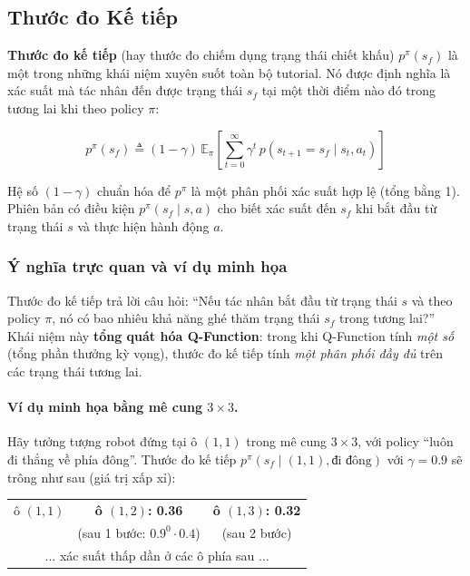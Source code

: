 \subsection{Thước đo Kế tiếp}
 
\textbf{Thước đo kế tiếp} (hay thước đo chiếm dụng trạng thái chiết khấu)
$p^\pi(s_f)$ là một trong những khái niệm xuyên suốt toàn bộ tutorial.
Nó được định nghĩa là xác suất mà tác nhân đến được trạng thái $s_f$ tại
một thời điểm nào đó trong tương lai khi theo policy $\pi$:
 
\begin{equation}
    p^\pi(s_f) \triangleq (1-\gamma) \, \mathbb{E}_\pi \left[
    \sum_{t=0}^{\infty} \gamma^t \, p(s_{t+1} = s_f \mid s_t, a_t)
    \right]
    \label{eq:successor_measure_intro}
\end{equation}
 
Hệ số $(1-\gamma)$ chuẩn hóa để $p^\pi$ là một phân phối xác suất hợp
lệ (tổng bằng 1). Phiên bản có điều kiện $p^\pi(s_f \mid s, a)$ cho
biết xác suất đến $s_f$ khi bắt đầu từ trạng thái $s$ và thực hiện
hành động $a$.
 
\subsubsection{Ý nghĩa trực quan và ví dụ minh họa}
 
Thước đo kế tiếp trả lời câu hỏi: ``Nếu tác nhân bắt đầu từ trạng thái
$s$ và theo policy $\pi$, nó có bao nhiêu khả năng ghé thăm trạng thái
$s_f$ trong tương lai?'' Khái niệm này \textbf{tổng quát hóa
Q-Function}: trong khi Q-Function tính \textit{một số} (tổng phần
thưởng kỳ vọng), thước đo kế tiếp tính \textit{một phân phối đầy đủ}
trên các trạng thái tương lai.

\paragraph{Ví dụ minh họa bằng mê cung $3 \times 3$.}

Hãy tưởng tượng robot đứng tại ô $(1,1)$ trong mê cung $3\times 3$,
với policy ``luôn đi thẳng về phía đông''. Thước đo kế tiếp
$p^\pi(s_f \mid (1,1), \text{đi đông})$ với $\gamma = 0.9$ sẽ trông
như sau (giá trị xấp xỉ):

\begin{center}
\begin{tabular}{|c|c|c|}
    \hline
    ô $(1,1)$ & \textbf{ô $(1,2)$: 0.36} & \textbf{ô $(1,3)$: 0.32} \\
    & (sau 1 bước: $0.9^0 \cdot 0.4$) & (sau 2 bước) \\
    \hline
    \multicolumn{3}{|c|}{... xác suất thấp dần ở các ô phía sau ...} \\
    \hline
\end{tabular}
\end{center}

